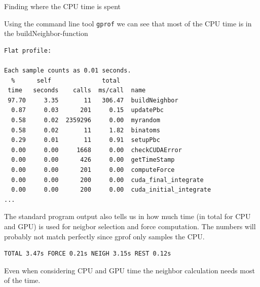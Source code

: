 \documentclass[ignorenonframetext,]{beamer}
\begin{document}
\begin{frame}[fragile]

\begin{block}{Finding where the CPU time is spent}

Using the command line tool \texttt{gprof} we can see that most of the
CPU time is in the buildNeighbor-function

\begin{verbatim}
Flat profile:

Each sample counts as 0.01 seconds.
  %      self              total           
 time   seconds    calls  ms/call  name    
 97.70     3.35       11   306.47  buildNeighbor
  0.87     0.03      201     0.15  updatePbc
  0.58     0.02  2359296     0.00  myrandom
  0.58     0.02       11     1.82  binatoms
  0.29     0.01       11     0.91  setupPbc
  0.00     0.00     1668     0.00  checkCUDAError
  0.00     0.00      426     0.00  getTimeStamp
  0.00     0.00      201     0.00  computeForce
  0.00     0.00      200     0.00  cuda_final_integrate
  0.00     0.00      200     0.00  cuda_initial_integrate
...
\end{verbatim}

\end{block}

\end{frame}

\begin{frame}[fragile]

The standard program output also tells us in how much time (in total for
CPU and GPU) is used for neigbor selection and force computation. The
numbers will probably not match perfectly since gprof only samples the
CPU.

\begin{verbatim}
TOTAL 3.47s FORCE 0.21s NEIGH 3.15s REST 0.12s
\end{verbatim}

Even when considering CPU and GPU time the neighbor calculation needs
most of the time.

\end{frame}
\end{document}
